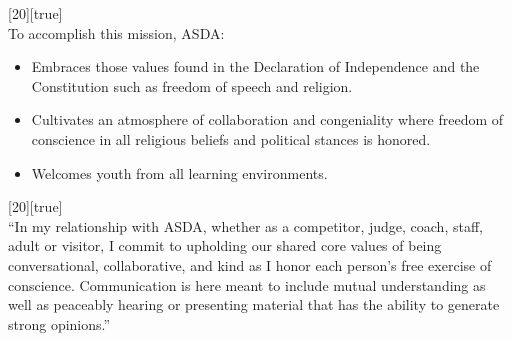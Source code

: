\documentclass[11pt]{memoir}    %
\def\lowspacing{9pt}
\def\regspacing{19pt}
\begin{document}
{\setcounter{tocdepth}{2}
\hypersetup{linkcolor=black}
\tableofcontents
}

\newpage

\label{sec:MissionStatement}
\noindent{}[20][true]\vspace{\regspacing}\\
{To accomplish this mission, ASDA:}\vspace{\lowspacing}
\begin{itemize}
    \item Embraces those values found in the Declaration of Independence and the Constitution such as freedom of speech and religion.
    \item Cultivates an atmosphere of collaboration and congeniality where freedom of conscience in all religious beliefs and political stances is honored.
    \item Welcomes youth from all learning environments.
\end{itemize}\vspace{\regspacing}

\label{sec:CoreValues}
\noindent{}[20][true]\vspace{\regspacing}\\
{“In my relationship with ASDA, whether as a competitor, judge, coach, staff, adult or visitor, I commit to upholding our shared core values of being conversational, collaborative, and kind as I honor each person’s free exercise of conscience. Communication is here meant to include mutual understanding as well as peaceably hearing or presenting material that has the ability to generate strong opinions.”}\vspace{\lowspacing}\\
\end{document}
